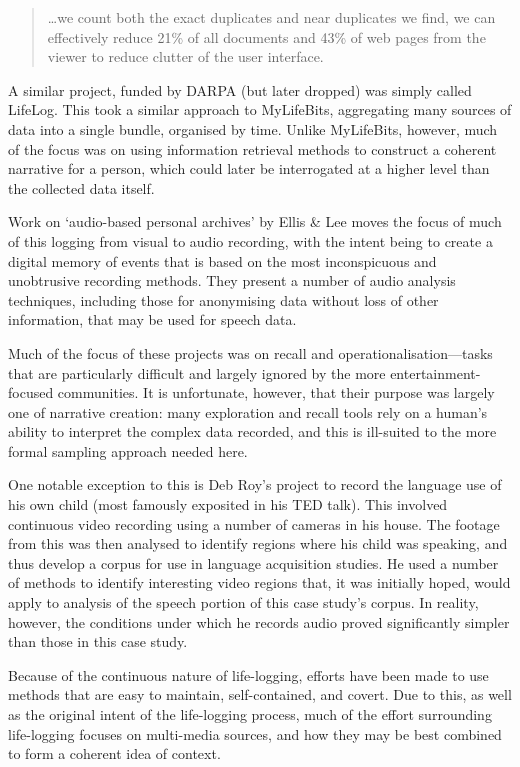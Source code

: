 \begin{quote}
\ldots{}we count both the exact duplicates and near duplicates we find, we can effectively reduce 21\% of all documents and 43\% of web pages from the viewer to reduce clutter of the user interface.
\end{quote}

A similar project, funded by DARPA (but later dropped) was simply called LifeLog\cite{allen2008dredging}.  This took a similar approach to MyLifeBits, aggregating many sources of data into a single bundle, organised by time.  Unlike MyLifeBits, however, much of the focus was on using information retrieval methods to construct a coherent narrative for a person, which could later be interrogated at a higher level than the collected data itself.

Work on `audio-based personal archives' by Ellis \& Lee\cite{ellis2004audiolog} moves the focus of much of this logging from visual to audio recording, with the intent being to create a digital memory of events that is based on the most inconspicuous and unobtrusive recording methods.  They present a number of audio analysis techniques, including those for anonymising data without loss of other information, that may be used for speech data.

Much of the focus of these projects was on recall and operationalisation---tasks that are particularly difficult and largely ignored by the more entertainment-focused communities.  It is unfortunate, however, that their purpose was largely one of narrative creation: many exploration and recall tools rely on a human's ability to interpret the complex data recorded, and this is ill-suited to the more formal sampling approach needed here.

One notable exception to this is Deb Roy's project to record the language use of his own child (most famously exposited in his TED talk\cite{roy2011ted}).  This involved continuous video recording using a number of cameras in his house.  The footage from this was then analysed to identify regions where his child was speaking, and thus develop a corpus for use in language acquisition studies.  He used a number of methods to identify interesting video regions that, it was initially hoped, would apply to analysis of the speech portion of this case study's corpus.  In reality, however, the conditions under which he records audio proved significantly simpler than those in this case study.



Because of the continuous nature of life-logging, efforts have been made to use methods that are easy to maintain, self-contained, and covert.  Due to this, as well as the original intent of the life-logging process, much of the effort surrounding life-logging focuses on multi-media sources, and how they may be best combined to form a coherent idea of context.  

